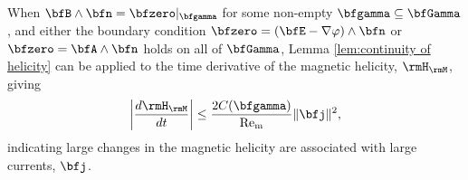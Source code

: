     \begin{corollary}
        When $\bfB\wedge\bfn  =  \bfzero|_{\bfgamma}$ for some non-empty $\bfgamma  \subseteq  \bfGamma$, and either the boundary condition $\bfzero  =  (\bfE - \nabla\varphi)\wedge\bfn$ or $\bfzero  =  \bfA\wedge\bfn$ holds on all of $\bfGamma$, Lemma \ref{lem:continuity of helicity} can be applied to the time derivative of the magnetic helicity, $\rmH_{\rmM}$, giving
        \begin{equation}
            \left|\frac{d\rmH_{\rmM}}{dt}\right|  \leq  \frac{2C(\bfgamma)}{\rmRem}\|\bfj\|^{2},
        \end{equation}
        indicating large changes in the magnetic helicity are associated with large currents, $\bfj$.
    \end{corollary}

    
    \line
    